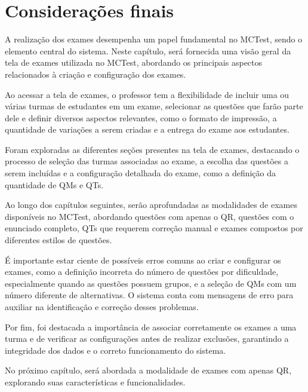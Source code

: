\section{Considerações finais}

A realização dos exames desempenha um papel fundamental no MCTest, sendo o elemento central do sistema. Neste capítulo, será fornecida uma visão geral da tela de exames utilizada no MCTest, abordando os principais aspectos relacionados à criação e configuração dos exames.

Ao acessar a tela de exames, o professor tem a flexibilidade de incluir uma ou várias turmas de estudantes em um exame, selecionar as questões que farão parte dele e definir diversos aspectos relevantes, como o formato de impressão, a quantidade de variações a serem criadas e a entrega do exame aos estudantes.

Foram exploradas as diferentes seções presentes na tela de exames, destacando o processo de seleção das turmas associadas ao exame, a escolha das questões a serem incluídas e a configuração detalhada do exame, como a definição da quantidade de QMs e QTs.

Ao longo dos capítulos seguintes, serão aprofundadas as modalidades de exames disponíveis no MCTest, abordando questões com apenas o QR, questões com o enunciado completo, QTs que requerem correção manual e exames compostos por diferentes estilos de questões.

É importante estar ciente de possíveis erros comuns ao criar e configurar os exames, como a definição incorreta do número de questões por dificuldade, especialmente quando as questões possuem grupos, e a seleção de QMs com um número diferente de alternativas. O sistema conta com mensagens de erro para auxiliar na identificação e correção desses problemas.

Por fim, foi destacada a importância de associar corretamente os exames a uma turma e de verificar as configurações antes de realizar exclusões, garantindo a integridade dos dados e o correto funcionamento do sistema.

No próximo capítulo, será abordada a modalidade de exames com apenas QR, explorando suas características e funcionalidades.